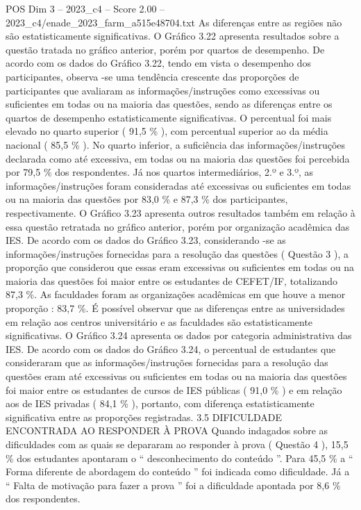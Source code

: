 \begin{textsample}{POS Dim 3 – 2023\_c4 – Score 2.00 – 2023\_c4/enade\_2023\_farm\_a515e48704.txt}
As diferenças entre as regiões não são estatisticamente significativas.
O Gráfico 3.22 apresenta resultados sobre a questão tratada no gráfico anterior, porém por quartos de desempenho.
De acordo com os dados do Gráfico 3.22, tendo em vista o desempenho dos participantes, observa -se uma tendência crescente das proporções de participantes que avaliaram as informações/instruções como excessivas ou suficientes em todas ou na maioria das questões, sendo as diferenças entre os quartos de desempenho estatisticamente significativas.
O percentual foi mais elevado no quarto superior ( 91,5 \% ), com percentual superior ao da média nacional ( 85,5 \% ).
No quarto inferior, a suficiência das informações/instruções declarada como até excessiva, em todas ou na maioria das questões foi percebida por 79,5 \% dos respondentes.
Já nos quartos intermediários, 2.º e 3.º, as informações/instruções foram consideradas até excessivas ou suficientes em todas ou na maioria das questões por 83,0 \% e 87,3 \% dos participantes, respectivamente.
O Gráfico 3.23 apresenta outros resultados também em relação à essa questão retratada no gráfico anterior, porém por organização acadêmica das IES.
De acordo com os dados do Gráfico 3.23, considerando -se as informações/instruções fornecidas para a resolução das questões ( Questão 3 ), a proporção que considerou que essas eram excessivas ou suficientes em todas ou na maioria das questões foi maior entre os estudantes de CEFET/IF, totalizando 87,3 \%.
As faculdades foram as organizações acadêmicas em que houve a menor proporção : 83,7 \%.
É possível observar que as diferenças entre as universidades em relação aos centros universitário e as faculdades são estatisticamente significativas.
O Gráfico 3.24 apresenta os dados por categoria administrativa das IES.
De acordo com os dados do Gráfico 3.24, o percentual de estudantes que consideraram que as informações/instruções fornecidas para a resolução das questões eram até excessivas ou suficientes em todas ou na maioria das questões foi maior entre os estudantes de cursos de IES públicas ( 91,0 \% ) e em relação aos de IES privadas ( 84,1 \% ), portanto, com diferença estatisticamente significativa entre as proporções registradas. 3.5 DIFICULDADE ENCONTRADA AO RESPONDER À PROVA Quando indagados sobre as dificuldades com as quais se depararam ao responder à prova ( Questão 4 ), 15,5 \% dos estudantes apontaram o “ desconhecimento do conteúdo ”.
Para 45,5 \% a “ Forma diferente de abordagem do conteúdo ” foi indicada como dificuldade.
Já a “ Falta de motivação para fazer a prova ” foi a dificuldade apontada por 8,6 \% dos respondentes.

\end{textsample}

